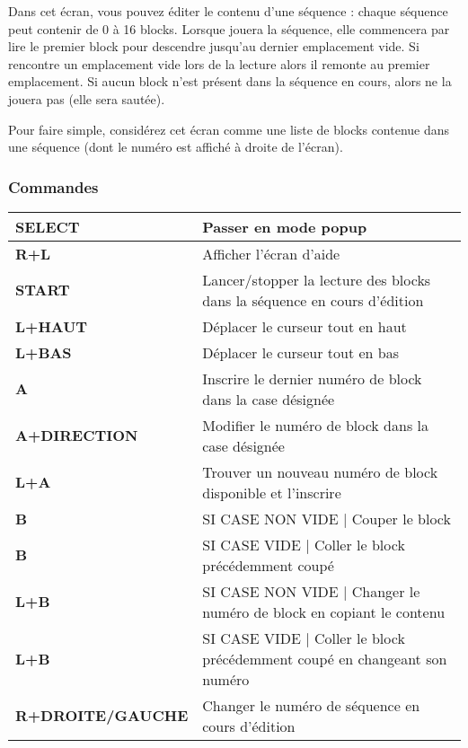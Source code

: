 Dans cet écran, vous pouvez éditer le contenu d'une séquence : chaque séquence peut contenir de 0 à 16 blocks.
Lorsque \FAT jouera la séquence, elle commencera par lire le premier block pour descendre jusqu'au dernier emplacement vide.
Si \FAT rencontre un emplacement vide lors de la lecture alors il remonte au premier emplacement.
Si aucun block n'est présent dans la séquence en cours, alors \FAT ne la jouera pas (elle sera sautée).
\medskip

Pour faire simple, considérez cet écran comme une liste de blocks contenue dans une séquence (dont le numéro est affiché à droite de l'écran).


\subsubsection{Commandes}
\tablelasttail{\hline}
\begin{supertabular}{|l|p{11cm}|}
\hline
    {\bf SELECT} & Passer en mode popup \\
    \hline
    {\bf R+L} & Afficher l'écran d'aide \\
    \hline
    {\bf START} & Lancer/stopper la lecture des blocks dans la séquence en cours d'édition \\
    \hline
    {\bf L+HAUT} & Déplacer le curseur tout en haut \\
    \hline
    {\bf L+BAS} & Déplacer le curseur tout en bas \\
    \hline
    {\bf A} & Inscrire le dernier numéro de block dans la case désignée \\
    \hline
    {\bf A+DIRECTION} & Modifier le numéro de block dans la case désignée \\
    \hline
    {\bf L+A} & Trouver un nouveau numéro de block disponible et l'inscrire \\
    \hline
    {\bf B} & SI CASE NON VIDE | Couper le block \\
    \hline
    {\bf B} & SI CASE VIDE | Coller le block précédemment coupé \\
    \hline
    {\bf L+B} & SI CASE NON VIDE | Changer le numéro de block en copiant le contenu \\
    \hline
    {\bf L+B} & SI CASE VIDE | Coller le block précédemment coupé en changeant son numéro \\
    \hline
    {\bf R+DROITE/GAUCHE} & Changer le numéro de séquence en cours d'édition \\
\hline
\end{supertabular}
